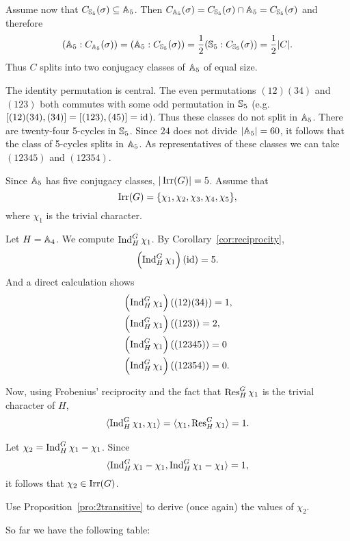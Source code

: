 Assume now that $C_{\mathbb{S}_5}(\sigma)\subseteq\mathbb{A}_5$. Then 
$C_{\mathbb{A}_5}(\sigma)=C_{\mathbb{S}_5}(\sigma)\cap\mathbb{A}_5=C_{\mathbb{S}_5}(\sigma)$
and therefore 
\[
(\mathbb{A}_5:C_{\mathbb{A}_5}(\sigma))=(\mathbb{A}_5:C_{\mathbb{S}_5}(\sigma))
=\frac12(\mathbb{S}_5:C_{\mathbb{S}_5}(\sigma))=\frac12|C|.
\]
Thus $C$ splits into two conjugacy classes of $\mathbb{A}_5$ of equal size. 

The identity permutation is central. The even permutations 
$(12)(34)$ and $(123)$ both commutes with some odd permutation in $\mathbb{S}_5$ (e.g. 
$[(12)(34),(34)]=[(123),(45)]=\operatorname{id}$). Thus these classes do not split
in $\mathbb{A}_5$. There are twenty-four 5-cycles in $\mathbb{S}_5$. Since $24$ does not
divide $|\mathbb{A}_5|=60$, it follows that the class of 5-cycles
splits in $\mathbb{A}_5$. As representatives of these classes
we can take $(12345)$ and $(12354)$. 

Since $\mathbb{A}_5$ has five conjugacy classes, $|\operatorname{Irr}(G)|=5$. Assume that 
\[
\operatorname{Irr}(G)=\{\chi_1,\chi_2,\chi_3,\chi_4,\chi_5\}, 
\]
where $\chi_1$ is the trivial character. 

Let $H=\mathbb{A}_4$. We compute $\operatorname{Ind}_H^G\chi_1$. By Corollary~\ref{cor:reciprocity}, 
\[
\left(\operatorname{Ind}_H^G\chi_1\right)(\operatorname{id}) = 5.
\]
And a direct calculation shows
\begin{align*}
    &\left(\operatorname{Ind}_H^G\chi_1\right)((12)(34)) = 1,\\
    &\left(\operatorname{Ind}_H^G\chi_1\right)((123)) = 2,\\
    &\left(\operatorname{Ind}_H^G\chi_1\right)((12345)) = 0\\ 
    &\left(\operatorname{Ind}_H^G\chi_1\right)((12354)) = 0.
\end{align*}

Now, using Frobenius' reciprocity and the fact that 
$\operatorname{Res}_H^G\chi_1$ is the trivial character of $H$, 
\begin{align*}
    \langle\operatorname{Ind}_H^G\chi_1,\chi_1\rangle = \langle\chi_1,\operatorname{Res}_H^G\chi_1\rangle=1.
\end{align*}

Let $\chi_2=\operatorname{Ind}_H^G\chi_1-\chi_1$. Since 
\[
\langle\operatorname{Ind}_H^G\chi_1-\chi_1,\operatorname{Ind}_H^G\chi_1-\chi_1\rangle=1, 
\]
it follows that $\chi_2\in\operatorname{Irr}(G)$. 

\begin{exercise}
\label{xca:A5_chi2}
    Use Proposition~\ref{pro:2transitive} to derive (once again) the values of $\chi_2$.
\end{exercise}

So far we have the 
following table: 

